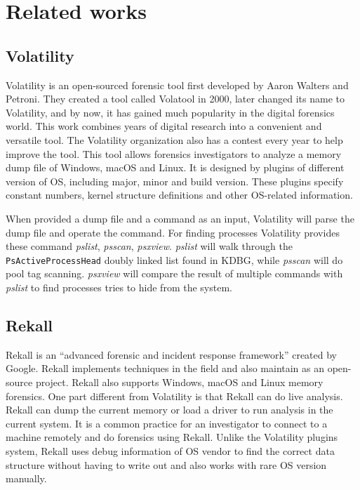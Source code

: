 \chapter[Related works]{Related works}

\section[Volatility]{Volatility}

Volatility \cite{volatility} is an open-sourced forensic tool first developed by Aaron Walters and Petroni. They created a tool called Volatool in 2000, later changed its name to Volatility, and by now, it has gained much popularity in the digital forensics world. This work combines years of digital research into a convenient and versatile tool. The Volatility organization also has a contest every year to help improve the tool. This tool allows forensics investigators to analyze a memory dump file of Windows, macOS and Linux. It is designed by plugins of different version of OS, including major, minor and build version. These plugins specify constant numbers, kernel structure definitions and other OS-related information.

When provided a dump file and a command as an input, Volatility will parse the dump file and operate the command. For finding processes Volatility provides these command \textit{pslist}, \textit{psscan}, \textit{psxview}. \textit{pslist} will walk through the \texttt{PsActiveProcessHead} doubly linked list found in KDBG, while \textit{psscan} will do pool tag scanning. \textit{psxview} will compare the result of multiple commands with \textit{pslist} to find processes tries to hide from the system.

\section[Rekall]{Rekall}

Rekall \cite{rekall} is an ``advanced forensic and incident response framework'' created by Google. Rekall implements techniques in the field and also maintain as an open-source project. Rekall also supports Windows, macOS and Linux memory forensics. One part different from Volatility is that Rekall can do live analysis. Rekall can dump the current memory or load a driver to run analysis in the current system. It is a common practice for an investigator to connect to a machine remotely and do forensics using Rekall. Unlike the Volatility plugins system, Rekall uses debug information of OS vendor to find the correct data structure without having to write out and also works with rare OS version manually.


